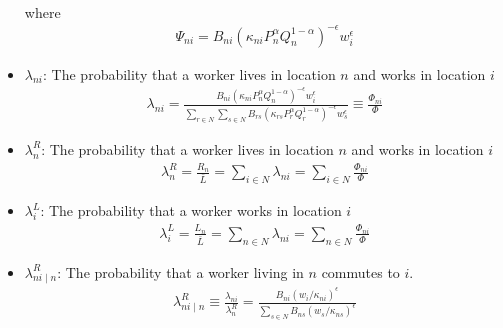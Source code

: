 \begin{itemize}
\begin{align}
        \end{align}
        where 
        \begin{align}
            \Psi_{n i}=B_{n i}\left(\kappa_{n i} P_n^\alpha Q_n^{1-\alpha}\right)^{-\epsilon} w_i^\epsilon
        \end{align}
    \item $\lambda_{ni}$: The probability that a worker lives in location $n$ and works in location $i$
        \begin{align}
            \lambda_{n i}=\frac{B_{n i}\left(\kappa_{n i} P_n^\alpha Q_n^{1-\alpha}\right)^{-\epsilon} w_i^\epsilon}{\sum_{r \in N} \sum_{s \in N} B_{r s}\left(\kappa_{r s} P_r^\alpha Q_r^{1-\alpha}\right)^{-\epsilon} w_s^\epsilon} \equiv \frac{\Phi_{n i}}{\Phi}
        \end{align}
    \item $\lambda_n^R$: The probability that a worker lives in location $n$ and works in location $i$
        \begin{align}
            \lambda_n^R=\frac{R_n}{\bar{L}}=\sum_{i \in N} \lambda_{n i}=\sum_{i \in N} \frac{\Phi_{n i}}{\Phi}
        \end{align}
    \item $\lambda_i^L$: The probability that a worker works in location $i$
        \begin{align}
            \lambda_i^L=\frac{L_n}{\bar{L}}=\sum_{n \in N} \lambda_{n i}=\sum_{n \in N} \frac{\Phi_{n i}}{\Phi}
        \end{align}
    \item $\lambda_{ni\mid n}^R$: The probability that a worker living in $n$ commutes to $i$.
        \begin{align}
            \lambda_{n i \mid n}^R \equiv \frac{\lambda_{n i}}{\lambda_n^R}=\frac{B_{n i}\left(w_i / \kappa_{n i}\right)^\epsilon}{\sum_{s \in N} B_{n s}\left(w_s / \kappa_{n s}\right)^\epsilon}
        \end{align}
\end{itemize}

